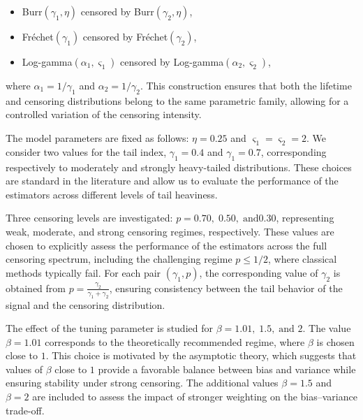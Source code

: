 \documentclass[reqno,openbib,runningheads,a4paper,12pt]{amsart}%
\begin{document}
\begin{itemize}
\item[$\bullet$] Burr$(\gamma_{1},\eta)$ censored by Burr$(\gamma_{2},\eta)$,

\item[$\bullet$] Fr\'{e}chet$(\gamma_{1})$ censored by Fr\'{e}chet$(\gamma
_{2})$,

\item[$\bullet$] Log-gamma$(\alpha_{1},\varsigma_{1})$ censored by
Log-gamma$(\alpha_{2},\varsigma_{2})$,
\end{itemize}

\noindent where $\alpha_{1}=1/\gamma_{1}$ and $\alpha_{2}=1/\gamma_{2}$. This
construction ensures that both the lifetime and censoring distributions belong
to the same parametric family, allowing for a controlled variation of the
censoring intensity.\smallskip

\noindent The model parameters are fixed as follows: $\eta=0.25$ and
$\varsigma_{1}=\varsigma_{2}=2$. We consider two values for the tail index,
$\gamma_{1}=0.4$ and $\gamma_{1}=0.7$, corresponding respectively to
moderately and strongly heavy-tailed distributions. These choices are standard
in the literature and allow us to evaluate the performance of the estimators
across different levels of tail heaviness.\smallskip

\noindent Three censoring levels are investigated: $p=0.70,\;0.50,\;\text{and
}0.30$, representing weak, moderate, and strong censoring regimes,
respectively. These values are chosen to explicitly assess the performance of
the estimators across the full censoring spectrum, including the challenging
regime $p\leq1/2$, where classical methods typically fail. For each pair
$(\gamma_{1},p)$, the corresponding value of $\gamma_{2}$ is obtained from
$p=\frac{\gamma_{2}}{\gamma_{1}+\gamma_{2}}$, ensuring consistency between the
tail behavior of the signal and the censoring distribution.\smallskip

\noindent The effect of the tuning parameter is studied for $\beta
=1.01,\;1.5,\;\text{and }2$. The value $\beta=1.01$ corresponds to the
theoretically recommended regime, where $\beta$ is chosen close to $1$. This
choice is motivated by the asymptotic theory, which suggests that values of
$\beta$ close to $1$ provide a favorable balance between bias and variance
while ensuring stability under strong censoring. The additional values
$\beta=1.5$ and $\beta=2$ are included to assess the impact of stronger
weighting on the bias--variance trade-off.\smallskip
\end{document}
